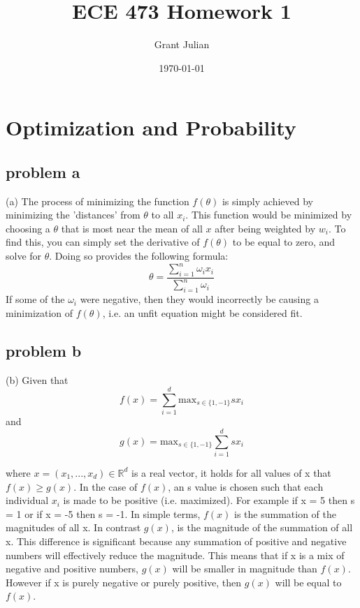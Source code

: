 \documentclass{article}
\title{ECE 473 Homework 1}
\author{Grant Julian}
\date{\today}
\begin{document}
\maketitle
\newpage
\tableofcontents
\newpage
\section{Optimization and Probability}
\subsection{problem a}
(a) The process of minimizing the function $f(\theta)$ is simply achieved by minimizing the 'distances' from $\theta$ to all $x_i$. This function would be minimized by choosing a $\theta$ that is most near the mean of all $x$ after being weighted by $w_i$. To find this, you can simply set the derivative of $f(\theta)$ to be equal to zero, and solve for $\theta$. Doing so provides the following formula:
\begin{equation}
  \theta = \frac{\sum_{i=1}^{n}\omega_{i}x_{i}}{\sum_{i=1}^{n}\omega_i}
\end{equation}
If some of the $\omega_{i}$ were negative, then they would incorrectly be causing a minimization of $f(\theta)$, i.e. an unfit equation might be considered fit.
\subsection{problem b}
(b) Given that
\begin{equation}
  f(x) = \sum_{i = 1}^{d}{\text{max}}_{s\in{\{1,-1\}}}sx_i
\end{equation}
and
\begin{equation}
  g(x) = {\text{max}}_{s\in{\{1,-1\}}}\sum_{i = 1}^{d}sx_i
\end{equation}

where $x = (x_{1},...,x_d) \in{\mathbb{R}^d}$ is a real vector, it holds for all values of x that $f(x) \geq g(x)$. In the case of $f(x)$, an s value is chosen such that each individual $x_i$ is made to be positive (i.e. maximized). For example if x = 5 then s = 1 or if x = -5 then s = -1. In simple terms, $f(x)$ is the summation of the magnitudes of all x. In contrast $g(x)$, is the magnitude of the summation of all x. This difference is significant because any summation of positive and negative numbers will effectively reduce the magnitude. This means that if x is a mix of negative and positive numbers, $g(x)$ will be smaller in magnitude than $f(x)$. However if x is purely negative or purely positive, then $g(x)$ will be equal to $f(x)$.
\end{document}
